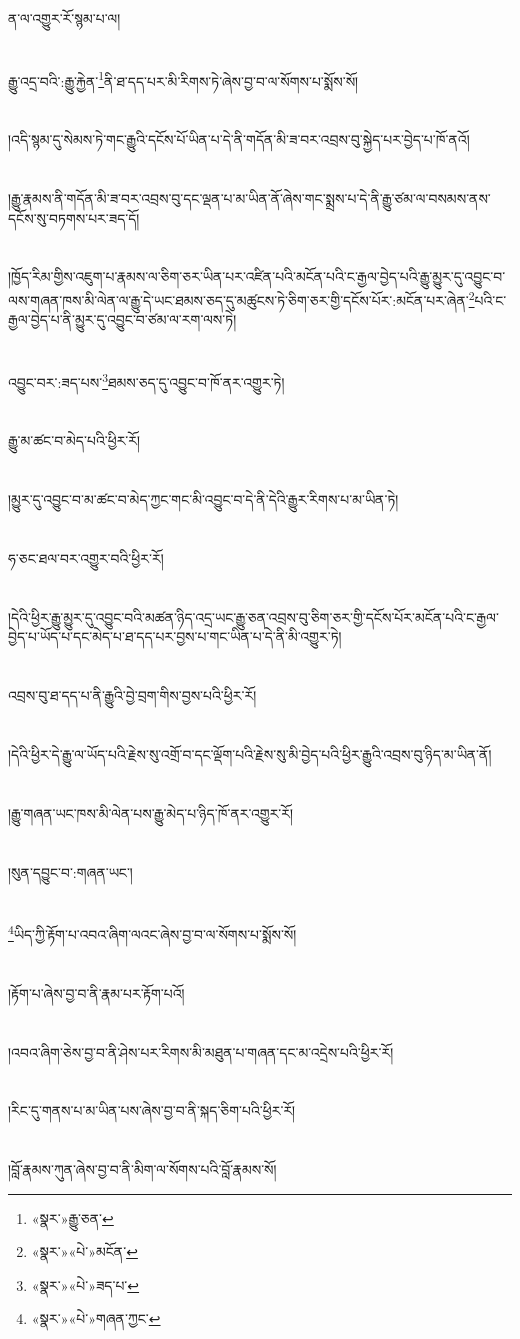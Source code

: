 ན་ལ་འགྱུར་རོ་སྙམ་པ་ལ།\chapter{ }རྒྱུ་འདྲ་བའི་:རྒྱུ་རྐྱེན་\footnote{«སྣར་»རྒྱུ་ཅན་}ནི་ཐ་དད་པར་མི་རིགས་ཏེ་ཞེས་བྱ་བ་ལ་སོགས་པ་སྨོས་སོ།\chapter{ }།འདི་སྙམ་དུ་སེམས་ཏེ་གང་རྒྱུའི་དངོས་པོ་ཡིན་པ་དེ་ནི་གདོན་མི་ཟ་བར་འབྲས་བུ་སྐྱེད་པར་བྱེད་པ་ཁོ་ནའོ།\chapter{ }།རྒྱུ་རྣམས་ནི་གདོན་མི་ཟ་བར་འབྲས་བུ་དང་ལྡན་པ་མ་ཡིན་ནོ་ཞེས་གང་སྨྲས་པ་དེ་ནི་རྒྱུ་ཙམ་ལ་བསམས་ནས་དངོས་སུ་བཏགས་པར་ཟད་དོ།\chapter{ }།ཁྱོད་རིམ་གྱིས་འཇུག་པ་རྣམས་ལ་ཅིག་ཅར་ཡིན་པར་འཛིན་པའི་མངོན་པའི་ང་རྒྱལ་བྱེད་པའི་རྒྱུ་མྱུར་དུ་འབྱུང་བ་ལས་གཞན་ཁས་མི་ལེན་ལ་རྒྱུ་དེ་ཡང་ཐམས་ཅད་དུ་མཚུངས་ཏེ་ཅིག་ཅར་གྱི་དངོས་པོར་:མངོན་པར་ཞེན་\footnote{«སྣར་»«པེ་»མངོན་}པའི་ང་རྒྱལ་བྱེད་པ་ནི་མྱུར་དུ་འབྱུང་བ་ཙམ་ལ་རག་ལས་ཏེ།\chapter{ }འབྱུང་བར་:ཟད་པས་\footnote{«སྣར་»«པེ་»ཟད་པ་}ཐམས་ཅད་དུ་འབྱུང་བ་ཁོ་ནར་འགྱུར་ཏེ།\chapter{ }རྒྱུ་མ་ཚང་བ་མེད་པའི་ཕྱིར་རོ།\chapter{ }།མྱུར་དུ་འབྱུང་བ་མ་ཚང་བ་མེད་ཀྱང་གང་མི་འབྱུང་བ་དེ་ནི་དེའི་རྒྱུར་རིགས་པ་མ་ཡིན་ཏེ།\chapter{ }ཧ་ཅང་ཐལ་བར་འགྱུར་བའི་ཕྱིར་རོ།\chapter{ }།དེའི་ཕྱིར་རྒྱུ་མྱུར་དུ་འབྱུང་བའི་མཚན་ཉིད་འདྲ་ཡང་རྒྱུ་ཅན་འབྲས་བུ་ཅིག་ཅར་གྱི་དངོས་པོར་མངོན་པའི་ང་རྒྱལ་བྱེད་པ་ཡོད་པ་དང་མེད་པ་ཐ་དད་པར་བྱས་པ་གང་ཡིན་པ་དེ་ནི་མི་འགྱུར་ཏེ།\chapter{ }འབྲས་བུ་ཐ་དད་པ་ནི་རྒྱུའི་བྱེ་བྲག་གིས་བྱས་པའི་ཕྱིར་རོ།\chapter{ }།དེའི་ཕྱིར་དེ་རྒྱུ་ལ་ཡོད་པའི་རྗེས་སུ་འགྲོ་བ་དང་ལྡོག་པའི་རྗེས་སུ་མི་བྱེད་པའི་ཕྱིར་རྒྱུའི་འབྲས་བུ་ཉིད་མ་ཡིན་ནོ།\chapter{ }།རྒྱུ་གཞན་ཡང་ཁས་མི་ལེན་པས་རྒྱུ་མེད་པ་ཉིད་ཁོ་ནར་འགྱུར་རོ།\chapter{ }།སུན་དབྱུང་བ་:གཞན་ཡང་།\chapter{ }\footnote{«སྣར་»«པེ་»གཞན་ཀྱང་}ཡིད་ཀྱི་རྟོག་པ་འབའ་ཞིག་ལའང་ཞེས་བྱ་བ་ལ་སོགས་པ་སྨོས་སོ།\chapter{ }།རྟོག་པ་ཞེས་བྱ་བ་ནི་རྣམ་པར་རྟོག་པའོ།\chapter{ }།འབའ་ཞིག་ཅེས་བྱ་བ་ནི་ཤེས་པར་རིགས་མི་མཐུན་པ་གཞན་དང་མ་འདྲེས་པའི་ཕྱིར་རོ།\chapter{ }།རིང་དུ་གནས་པ་མ་ཡིན་པས་ཞེས་བྱ་བ་ནི་སྐད་ཅིག་པའི་ཕྱིར་རོ།\chapter{ }།བློ་རྣམས་ཀུན་ཞེས་བྱ་བ་ནི་མིག་ལ་སོགས་པའི་བློ་རྣམས་སོ།\chap